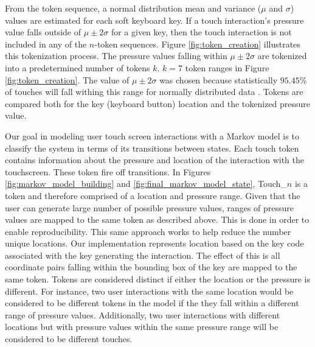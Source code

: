 \documentclass{acm_proc_article-sp}
\begin{document}
From the token sequence,
a normal distribution mean and variance ($\mu$ and $\sigma$) values are estimated for each soft keyboard key.
If a touch interaction's pressure value falls outside of
$\mu \pm 2\sigma$ for a given key, 
then the touch interaction is not included in any of the $n$-token sequences. 
Figure \ref{fig:token_creation} illustrates 
this tokenization process.
The pressure values falling within $\mu \pm 2\sigma$ are tokenized
into a predetermined number of tokens $k$. 
$k=7$ token ranges in Figure \ref{fig:token_creation}.
The value of $\mu \pm 2\sigma$ was chosen because statistically $95.45$\% of touches 
will fall withing this range for normally distributed data \cite{threesigmarule}.
Tokens are compared both for the key (keyboard button) location and the tokenized pressure value.





Our goal in modeling user touch screen interactions with a Markov model
is to classify the system in terms of its transitions between states. 
Each touch token contains information about the pressure and location 
of the interaction with the touchscreen.
These token fire off transitions.
In Figures \ref{fig:markov_model_building} and \ref{fig:final_markov_model_state}, 
Touch\_$n$ is a token and therefore comprised of a location and pressure range.
%
Given that the user can generate large number of possible pressure values,
ranges of pressure values are mapped to the same token as described above.
This is done in order to enable reproducibility.
This same approach works to help reduce the number unique locations.
Our implementation represents location based
on the key code associated with the key generating the interaction.
The effect of this is 
all coordinate pairs falling within the bounding box
of the key are mapped to the same token.
%
Tokens are considered distinct if
either the location or the pressure is different.
For instance, two user interactions with the same location
would be considered to be different tokens in the model if
the they fall within a different range of pressure values.
Additionally, two user interactions with different locations but with pressure
values within the same pressure range will be considered to be different touches.
\end{document}
